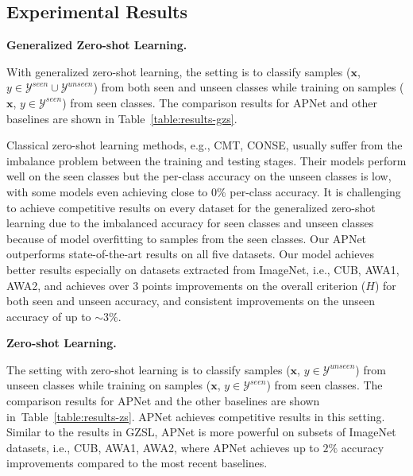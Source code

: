 \documentclass[letterpaper]{article}
\def\Tabref#1{Table~\ref{#1}}
\def\vx{{\bm{x}}}
\begin{document}
\subsection{Experimental Results}

\noindent\textbf{Generalized Zero-shot Learning.}

\noindent With generalized zero-shot learning, the setting is to classify samples ($\vx$, $y \in \mathcal{Y}^{seen}\cup\mathcal{Y}^{unseen}$) from both seen and unseen classes while training on samples ($\vx$, $y \in \mathcal{Y}^{seen}$) from seen classes. The comparison results for APNet and other baselines are shown in \Tabref{table:results-gzs}.


Classical zero-shot learning methods, e.g., CMT, CONSE, usually suffer from the imbalance problem between the training and testing stages. Their models perform well on the seen classes but the per-class accuracy on the unseen classes is low, with some models even achieving close to 0\% per-class accuracy.
It is challenging to achieve competitive results on every dataset for the generalized zero-shot learning due to the imbalanced accuracy for seen classes and unseen classes because of model overfitting to samples from the seen classes.
Our APNet outperforms state-of-the-art results on all five datasets.
Our model achieves better results especially on datasets extracted from ImageNet, i.e., CUB, AWA1, AWA2, and achieves over 3 points improvements on the overall criterion ($H$) for both seen and unseen accuracy, and
consistent improvements on the unseen accuracy of up to $\sim 3\%$.





\noindent\textbf{Zero-shot Learning.}

\noindent The setting with zero-shot learning is to classify samples ($\vx$, $y \in \mathcal{Y}^{unseen}$) from unseen classes while training on samples ($\vx$, $y \in \mathcal{Y}^{seen}$) from seen classes. The comparison results for APNet and the other baselines are shown in~\Tabref{table:results-zs}.
APNet achieves competitive results in this setting.
Similar to the results in GZSL, APNet is more powerful on subsets of ImageNet datasets, i.e., CUB, AWA1, AWA2, where APNet achieves up to $2\%$ accuracy improvements compared to the most recent baselines.
\end{document}

